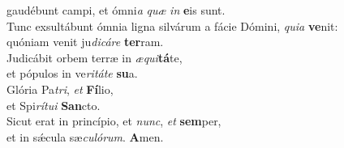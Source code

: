 \oddverse gaudébunt campi, et ómni\textit{a} \textit{quæ} \textit{in} \textbf{e}is sunt.\\
\evenverse Tunc exsultábunt ómnia ligna silvárum a fácie Dómini, \textit{qui}\textit{a} \textbf{ve}nit:~\*\\
\evenverse quóniam venit ju\textit{di}\textit{cá}\textit{re} \textbf{ter}ram.\\
\oddverse Judicábit orbem terræ in \textit{æ}\textit{qui}\textbf{tá}te,~\*\\
\oddverse et pópulos in ve\textit{ri}\textit{tá}\textit{te} \textbf{su}a.\\
\evenverse Glória Pa\textit{tri}, \textit{et} \textbf{Fí}lio,~\*\\
\evenverse et Spi\textit{rí}\textit{tu}\textit{i} \textbf{San}cto.\\
\oddverse Sicut erat in princípio, et \textit{nunc}, \textit{et} \textbf{sem}per,~\*\\
\oddverse et in sǽcula sæ\textit{cu}\textit{ló}\textit{rum}. \textbf{A}men.\\
